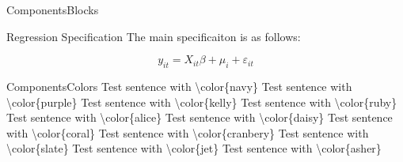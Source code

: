 \documentclass[aspectratio=43]{beamer}
\begin{document}
\begin{frame}{Components}{Blocks}
    \begin{block}{Regression Specification}
        The main specificaiton is as follows: 

        \[
            y_{it} = X_{it} \beta + \mu_i + \varepsilon_{it}
        \]
    \end{block}
\end{frame}

\begin{frame}{Components}{Colors}
    {\color{navy} Test sentence with \textbackslash color\{navy\}}\newline
    {\color{purple} Test sentence with \textbackslash color\{purple\}}\newline
    {\color{kelly} Test sentence with \textbackslash color\{kelly\}}\newline
    {\color{ruby} Test sentence with \textbackslash color\{ruby\}}\newline
    {\color{alice} Test sentence with \textbackslash color\{alice\}}\newline
    {\color{daisy} Test sentence with \textbackslash color\{daisy\}}\newline
    {\color{coral} Test sentence with \textbackslash color\{coral\}}\newline
    {\color{cranberry} Test sentence with \textbackslash color\{cranbery\}}\newline
    {\color{slate} Test sentence with \textbackslash color\{slate\}}\newline
    {\color{jet} Test sentence with \textbackslash color\{jet\}}\newline
    {\color{asher} Test sentence with \textbackslash color\{asher\}}\newline
\end{frame}
\end{document}
